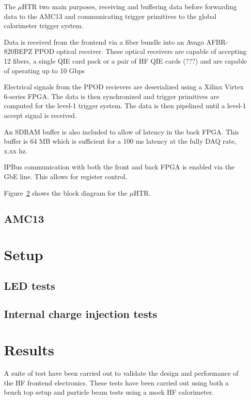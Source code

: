 \documentclass[11pt]{article} %
\begin{document}
The $\mu$HTR two main purposes, receiving and buffering data before forwarding data to the AMC13 and communicating trigger primitives to the global calorimeter trigger system.  

Data is received from the frontend via a fiber bundle into an Avago AFBR-820BEPZ PPOD optical receiver.  
These optical receivers are capable of accepting 12 fibers, a single QIE card pack or a pair of HF QIE cards (???)
and are capable of operating up to 10 Gbps

Electrical signals from the PPOD recievers are deserialized using a Xilinx Virtex 6-series FPGA.  The data is then
synchronized and trigger primitives are computed for the level-1 trigger system.  The data is then pipelined 
until a level-1 accept signal is received.  

An SDRAM buffer is also included to allow of latency in the back FPGA.  This buffer is 64 MB which is sufficient
for a 100 ms latency at the fully DAQ rate, x.xx hz.  

IPBus communication with both the front and back FPGA is enabled via the GbE line.  This allows for register 
control.  

Figure~\ref{} shows the block diagram for the  $\mu$HTR.  

\subsection{AMC13}

\section{Setup}

\subsection{LED tests}

\subsection{Internal charge injection tests}

\section{Results}

A suite of test have been carried out to validate the design and performance of the HF frontend electronics.  
These tests have been carried out using both a bench top setup and particle beam tests using a mock HF 
calorimeter.
\end{document}
